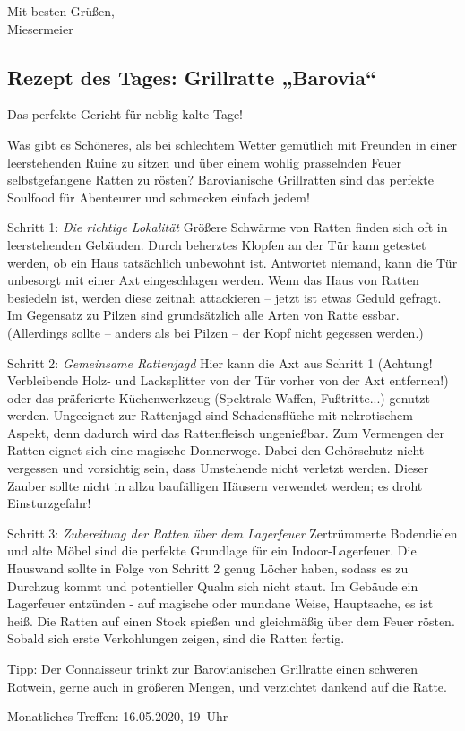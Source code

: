 \noindent
Mit besten Grüßen, \\
Miesermeier


\subsection{Rezept des Tages: Grillratte „Barovia“}

Das perfekte Gericht für neblig-kalte Tage!

Was gibt es Schöneres, als bei schlechtem Wetter gemütlich mit Freunden in einer leerstehenden Ruine zu sitzen und über einem wohlig prasselnden Feuer selbstgefangene Ratten zu rösten? Barovianische Grillratten sind das perfekte Soulfood für Abenteurer und schmecken einfach jedem!

Schritt 1: \textit{Die richtige Lokalität}
Größere Schwärme von Ratten finden sich oft in leerstehenden Gebäuden. Durch beherztes Klopfen an der Tür kann getestet werden, ob ein Haus tatsächlich unbewohnt ist. Antwortet niemand, kann die Tür unbesorgt mit einer Axt eingeschlagen werden. Wenn das Haus von Ratten besiedeln ist, werden diese zeitnah attackieren – jetzt ist etwas Geduld gefragt.
Im Gegensatz zu Pilzen sind grundsätzlich alle Arten von Ratte essbar. (Allerdings sollte – anders als bei Pilzen – der Kopf nicht gegessen werden.)

Schritt 2: \textit{Gemeinsame Rattenjagd}
Hier kann die Axt aus Schritt 1 (Achtung! Verbleibende Holz- und Lacksplitter von der Tür vorher von der Axt entfernen!) oder das präferierte Küchenwerkzeug (Spektrale Waffen, Fußtritte...) genutzt werden. Ungeeignet zur Rattenjagd sind Schadensflüche mit nekrotischem Aspekt, denn dadurch wird das Rattenfleisch ungenießbar.
Zum Vermengen der Ratten eignet sich eine magische Donnerwoge. Dabei den Gehörschutz nicht vergessen und vorsichtig sein, dass Umstehende nicht verletzt werden. Dieser Zauber sollte nicht in allzu baufälligen Häusern verwendet werden; es droht Einsturzgefahr!

Schritt 3: \textit{Zubereitung der Ratten über dem Lagerfeuer}
Zertrümmerte Bodendielen und alte Möbel sind die perfekte Grundlage für ein Indoor-Lagerfeuer. Die Hauswand sollte in Folge von Schritt 2 genug Löcher haben, sodass es zu Durchzug kommt und potentieller Qualm sich nicht staut. Im Gebäude ein Lagerfeuer entzünden - auf magische oder mundane Weise, Hauptsache, es ist heiß. Die Ratten auf einen Stock spießen und gleichmäßig über dem Feuer rösten. Sobald sich erste Verkohlungen zeigen, sind die Ratten fertig.

Tipp: Der Connaisseur trinkt zur Barovianischen Grillratte einen schweren Rotwein, gerne auch in größeren Mengen, und verzichtet dankend auf die Ratte.



\begin{termine}
  \item Monatliches Treffen: 16.05.2020, 19~Uhr
\end{termine}
\impressum


